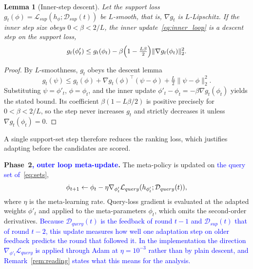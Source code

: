 \documentclass[journal]{IEEEtran}
\newtheorem{Lemma}{Lemma}
\theoremstyle{remark}
\newcommand{\revision}[1]{#1}
\newcommand{\revtwo}[1]{\textcolor{blue}{#1}}
\begin{document}
{\color{black}
\begin{Lemma}[Inner-step descent]\label{stmt:inner}
Let the support loss $g_t(\phi)=\mathcal{L}_{sup}(h_\phi;\mathcal{D}_{sup}(t))$ be $L$-smooth, that is, $\nabla g_t$ is $L$-Lipschitz. If the inner step size obeys $0<\beta<2/L$, the inner update~\eqref{eq:inner_loop} is a descent step on the support loss,
\[
g_t(\phi'_t)\le g_t(\phi_t)-\beta\Bigl(1-\tfrac{L\beta}{2}\Bigr)\lVert\nabla g_t(\phi_t)\rVert_2^2 .
\]
\end{Lemma}
\begin{proof}
By $L$-smoothness, $g_t$ obeys the descent lemma
\[
g_t(\psi)\le g_t(\phi)+\nabla g_t(\phi)^{\top}(\psi-\phi)+\tfrac{L}{2}\lVert\psi-\phi\rVert_2^2 .
\]
Substituting $\psi=\phi'_t$, $\phi=\phi_t$, and the inner update $\phi'_t-\phi_t=-\beta\nabla g_t(\phi_t)$ yields the stated bound. Its coefficient $\beta(1-L\beta/2)$ is positive precisely for $0<\beta<2/L$, so the step never increases $g_t$ and strictly decreases it unless $\nabla g_t(\phi_t)=0$.
\end{proof}
A single support-set step therefore reduces the ranking loss, which justifies adapting before the candidates are scored.
}

\textbf{Phase~2\revtwo{, outer loop meta-update}.}
\revision{%
The meta-policy is updated on \revtwo{the query set of~\eqref{eq:sets}},}
\begin{equation}
		\color{black}
		\phi_{t+1} \leftarrow \phi_t - \eta \nabla_{\phi'_t} \mathcal{L}_{query}(h_{\phi'_t}; \mathcal{D}_{query}(t)),
		\label{eq:outer_loop}
\end{equation}
\revision{where $\eta$ is the meta-learning rate. %
Query-loss gradient is evaluated at the adapted weights $\phi'_t$ and applied to the meta-parameters $\phi_t$, which omits the second-order derivatives.} \revtwo{Because $\mathcal{D}_{query}(t)$ is the feedback of round $t-1$ and $\mathcal{D}_{sup}(t)$ that of round $t-2$, this update measures how well one adaptation step on older feedback predicts the round that followed it. In the implementation the direction $\nabla_{\phi'_t}\mathcal{L}_{query}$ is applied through Adam at $\eta=10^{-3}$ rather than by plain descent, and Remark~\ref{rem:reading} states what this means for the analysis.}
\end{document}
